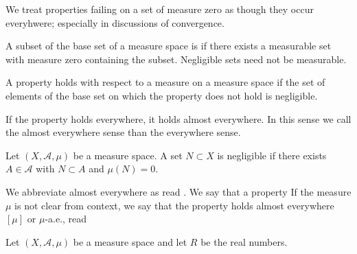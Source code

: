 
\sbasic

























\sstart
{}


We treat properties failing
on a set of measure zero
as
though they occur everyhwere;
especially in discussions of
convergence.


A subset of
the base set of a measure
space is
if there exists a
measurable set
with measure zero
containing
the subset.
Negligible sets
need not be
measurable.


A property holds
with respect to a measure
on a measure space if
the set of elements
of the base set on which
the property does not hold
is negligible.

If the property holds
everywhere, it holds
almost everywhere.
In this sense
we call the
almost everywhere sense
than the everywhere sense.


Let
$(X, \mathcal{A}, \mu)$
be a measure space.
A set
$N \subset X$ is
negligible if there
exists $A \in \mathcal{A}$
with $N \subset A$ and
$\mu(N) = 0$.

We abbreviate almost
everywhere as 
read .
We say that a property
If the measure $\mu$ is
not clear from context,
we say that the property
holds almost everywhere
$[\mu]$ or
$\mu$-a.e., read


Let $(X, \mathcal{A}, \mu)$
be a measure space
and let $R$ be the real numbers.

